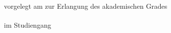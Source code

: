 \begin{titlepage}
\begin{center}
\singlespacing

vorgelegt am \abgabedatum \space zur Erlangung des akademischen Grades\\[1.2ex]
\akademischergrad\\[1.2ex]
im Studiengang \studiengang

\end{center}

\singlespacing

\end{titlepage}


\newpage